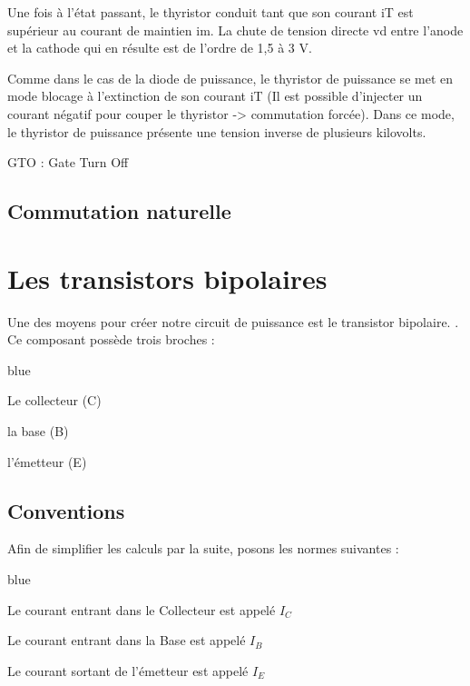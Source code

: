 {Une fois à l’état passant, le thyristor conduit tant que son courant iT est supérieur au
courant de maintien im. La chute de tension directe vd entre l’anode et la cathode qui en
résulte est de l’ordre de 1,5 à 3 V.


Comme dans le cas de la diode de puissance, le thyristor de puissance se met en mode
blocage à l’extinction de son courant iT (Il est possible d'injecter un courant négatif pour couper le thyristor -> commutation forcée). Dans ce mode, le thyristor de puissance
présente une tension inverse de plusieurs kilovolts.

GTO : Gate Turn Off


\subsection{Commutation naturelle}



\section{Les transistors bipolaires}

Une des moyens pour créer notre circuit de puissance est le transistor bipolaire. . Ce composant possède trois broches : 

\begin{items}{blue}{\Triangle}

  \item Le collecteur (C)
  \item la base (B)
  \item l'émetteur (E)

\end{items}


\subsection{Conventions}

Afin de simplifier les calculs par la suite, posons les normes suivantes : 

\begin{items}{blue}{\Triangle}

  \item Le courant entrant dans le Collecteur est appelé $I_{C}$
  \item Le courant entrant dans la Base est appelé $I_{B}$
  \item Le courant sortant de l'émetteur est appelé $I_{E}$


\end{items}}
